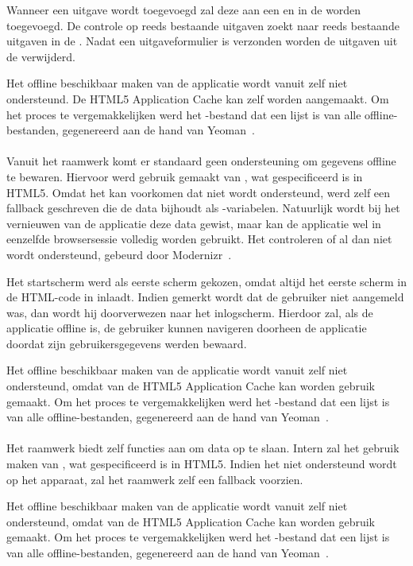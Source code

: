 Wanneer een uitgave wordt toegevoegd zal deze aan een  en in de  worden toegevoegd.
De controle op reeds bestaande uitgaven zoekt naar reeds bestaande uitgaven in de .
Nadat een uitgaveformulier is verzonden worden de uitgaven uit de  verwijderd.

    

Het offline beschikbaar maken van de applicatie wordt vanuit \kendo{} zelf niet ondersteund.
De HTML5 Application Cache kan zelf worden aangemaakt.
Om het proces te vergemakkelijken werd het -bestand dat een lijst is van alle offline-bestanden, gegenereerd aan de hand van Yeoman~\cite{Yeoman2013}.

\paragraph{\jqm}
Vanuit het raamwerk komt er standaard geen ondersteuning om gegevens offline te bewaren.
Hiervoor werd gebruik gemaakt van , wat gespecificeerd is in HTML5.
Omdat het kan voorkomen dat  niet wordt ondersteund, werd zelf een fallback geschreven die de data bijhoudt als \js{}-variabelen.
Natuurlijk wordt bij het vernieuwen van de applicatie deze data gewist, maar kan de applicatie wel in eenzelfde browsersessie volledig worden gebruikt.
Het controleren of  al dan niet wordt ondersteund, gebeurd door Modernizr~\cite{Modernizr2012}.


Het startscherm werd als eerste scherm gekozen, omdat \jqm{} altijd het eerste scherm in de HTML-code in inlaadt.
Indien gemerkt wordt dat de gebruiker niet aangemeld was, dan wordt hij doorverwezen naar het inlogscherm.
Hierdoor zal, als de applicatie offline is, de gebruiker kunnen navigeren doorheen de applicatie doordat zijn gebruikersgegevens werden bewaard.

Het offline beschikbaar maken van de applicatie wordt vanuit \jqm{} zelf niet ondersteund, omdat van de HTML5 Application Cache kan worden gebruik gemaakt.
Om het proces te vergemakkelijken werd het -bestand dat een lijst is van alle offline-bestanden, gegenereerd aan de hand van Yeoman~\cite{Yeoman2013}.

\paragraph{\lungo}
Het raamwerk biedt zelf functies aan om data op te slaan.
Intern zal het gebruik maken van , wat gespecificeerd is in HTML5.
Indien het niet ondersteund wordt op het apparaat, zal het raamwerk zelf een fallback voorzien.

Het offline beschikbaar maken van de applicatie wordt vanuit \lungo{} zelf niet ondersteund, omdat van de HTML5 Application Cache kan worden gebruik gemaakt.
Om het proces te vergemakkelijken werd het -bestand dat een lijst is van alle offline-bestanden, gegenereerd aan de hand van Yeoman~\cite{Yeoman2013}.